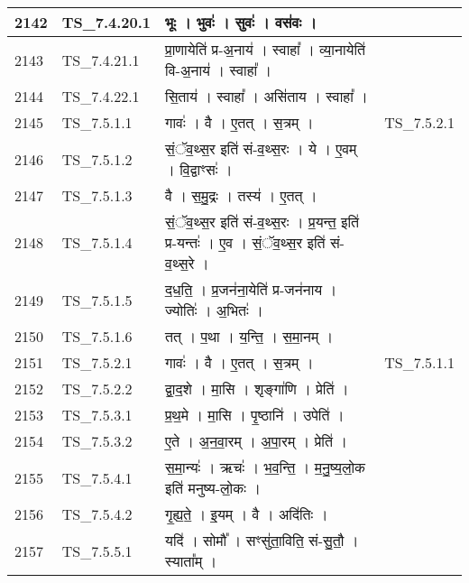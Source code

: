 \documentclass[17pt]{extarticle}
\begin{document}
\begin{longtable}{||p{0.4in}||p{0.9in}||p{4.0in}||p{0.9in}||}
        \hline
            2142 & TS\_7.4.20.1 & भूः   ।   भुवः॑   ।   सुवः॑   ।   वस॑वः   ।    &      \\
        \hline
            2143 & TS\_7.4.21.1 & प्रा॒णायेति॑ प्र{-}अ॒नाय॑   ।   स्वाहा᳚   ।   व्या॒नायेति॑ वि{-}अ॒नाय॑   ।   स्वाहा᳚   ।    &      \\
        \hline
            2144 & TS\_7.4.22.1 & सि॒ताय॑   ।   स्वाहा᳚   ।   असि॑ताय   ।   स्वाहा᳚   ।    &      \\
        \hline
            2145 & TS\_7.5.1.1 & गावः॑   ।   वै   ।   ए॒तत्   ।   स॒त्रम्   ।    &  TS\_7.5.2.1       \\
        \hline
            2146 & TS\_7.5.1.2 & सं॒ॅव॒थ्स॒र इति॑ सं{-}व॒थ्स॒रः   ।   ये   ।   ए॒वम्   ।   वि॒द्वाꣳसः॑   ।    &      \\
        \hline
            2147 & TS\_7.5.1.3 & वै   ।   स॒मु॒द्रः   ।   तस्य॑   ।   ए॒तत्   ।    &      \\
        \hline
            2148 & TS\_7.5.1.4 & सं॒ॅव॒थ्स॒र इति॑ सं{-}व॒थ्स॒रः   ।   प्र॒यन्त॒ इति॑ प्र{-}यन्तः॑   ।   ए॒व   ।   सं॒ॅव॒थ्स॒र इति॑ सं{-}व॒थ्स॒रे   ।    &      \\
        \hline
            2149 & TS\_7.5.1.5 & द॒ध॒ति॒   ।   प्र॒जन॑ना॒येति॑ प्र{-}जन॑नाय   ।   ज्योतिः॑   ।   अ॒भितः॑   ।    &      \\
        \hline
            2150 & TS\_7.5.1.6 & तत्   ।   प॒था   ।   य॒न्ति॒   ।   स॒मा॒नम्   ।    &      \\
        \hline
            2151 & TS\_7.5.2.1 & गावः॑   ।   वै   ।   ए॒तत्   ।   स॒त्रम्   ।    & TS\_7.5.1.1        \\
        \hline
            2152 & TS\_7.5.2.2 & द्वा॒द॒शे   ।   मा॒सि   ।   शृङ्गा॑णि   ।   प्रेति॑   ।    &      \\
        \hline
            2153 & TS\_7.5.3.1 & प्र॒थ॒मे   ।   मा॒सि   ।   पृ॒ष्ठानि॑   ।   उपेति॑   ।    &      \\
        \hline
            2154 & TS\_7.5.3.2 & ए॒ते   ।   अ॒न॒वा॒रम्   ।   अ॒पा॒रम्   ।   प्रेति॑   ।    &      \\
        \hline
            2155 & TS\_7.5.4.1 & स॒मा॒न्यः॑   ।   ऋचः॑   ।   भ॒व॒न्ति॒   ।   म॒नु॒ष्य॒लो॒क इति॑ मनुष्य{-}लो॒कः   ।    &      \\
        \hline
            2156 & TS\_7.5.4.2 & गृ॒ह्य॒ते॒   ।   इ॒यम्   ।   वै   ।   अदि॑तिः   ।    &      \\
        \hline
            2157 & TS\_7.5.5.1 & यदि॑   ।   सोमौ᳚   ।   सꣳसु॑ता॒विति॒ सं{-}सु॒तौ॒   ।   स्याता᳚म्   ।    &      \\

\end{longtable}
\end{document}
